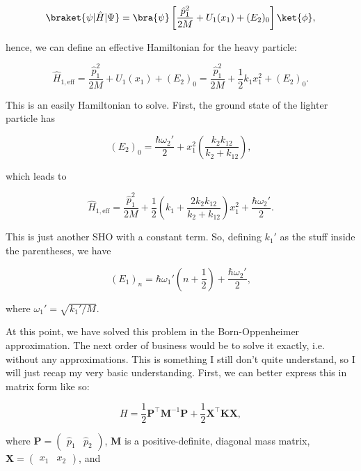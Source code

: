 \begin{equation}
  \braket{\psi | \hat{H} | \Psi} = \bra{\psi}\left[ \frac{\hat{p}_1^2}{2M} + U_1(x_1) + (E_2)_0 \right]\ket{\phi},
\end{equation}

hence, we can define an effective Hamiltonian for the heavy particle:

\begin{equation}
  \hat{H}_{1,\mathrm{eff}} = \frac{\hat{p}_1^2}{2M} + U_1(x_1) + (E_2)_0 = \frac{\hat{p}_1^2}{2M} + \frac{1}{2}k_1x_1^2 + (E_2)_0.
\end{equation}

This is an easily Hamiltonian to solve. First, the ground state of the lighter particle has

\begin{equation}
  (E_2)_0 = \frac{\hbar\omega_2'}{2} + x_1^2\left( \frac{k_2k_{12}}{k_2 + k_{12}} \right),
\end{equation}

which leads to

\begin{equation}
  \hat{H}_{1,\mathrm{eff}} = \frac{\hat{p}_1^2}{2M} + \frac{1}{2}\left( k_1 + \frac{2k_2k_{12}}{k_2 + k_{12}} \right)x_1^2 + \frac{\hbar\omega_2'}{2}.
\end{equation}

This is just another SHO with a constant term. So, defining $k_1'$ as the stuff inside the parentheses, we have

\begin{equation}
  (E_1)_n = \hbar\omega_1'\left( n + \frac{1}{2} \right) + \frac{\hbar\omega_2'}{2},
\end{equation}

where $\omega_1' = \sqrt{k_1'/M}$.

At this point, we have solved this problem in the Born-Oppenheimer approximation. The next order of business would be to solve it exactly, i.e. without any approximations. This is something I still don't quite understand, so I will just recap my very basic understanding. First, we can better express this in matrix form like so:

\begin{equation}
  H = \frac{1}{2}\mathbf{P}^\intercal \mathbf{M}^{-1} \mathbf{P} + \frac{1}{2}\mathbf{X}^\intercal \mathbf{K} \mathbf{X},
\end{equation}

where $\mathbf{P} = \begin{pmatrix}\hat{p}_1 & \hat{p}_2\end{pmatrix}$, $\mathbf{M}$ is a positive-definite, diagonal mass matrix, $\mathbf{X} = \begin{pmatrix}x_1 & x_2\end{pmatrix}$, and

